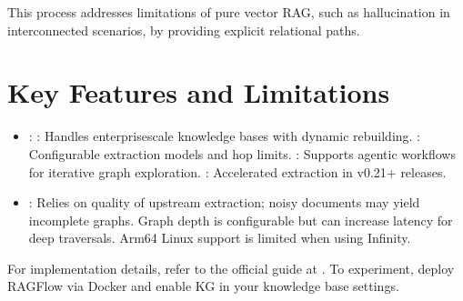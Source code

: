 \documentclass[letterpaper,10pt,english]{sphinxmanual}
\begin{document}
\sphinxAtStartPar
This process addresses limitations of pure vector RAG, such as hallucination in interconnected scenarios, by providing explicit relational paths.


\section{Key Features and Limitations}
\label{\detokenize{graph:key-features-and-limitations}}\begin{itemize}
\item {} 
\sphinxAtStartPar
{}:
\sphinxhyphen{} : Handles enterprise\sphinxhyphen{}scale knowledge bases with dynamic rebuilding.
\sphinxhyphen{} : Configurable extraction models and hop limits.
\sphinxhyphen{} : Supports agentic workflows for iterative graph exploration.
\sphinxhyphen{} : Accelerated extraction in v0.21+ releases.

\item {} 
\sphinxAtStartPar
{}:
\sphinxhyphen{} Relies on quality of upstream extraction; noisy documents may yield incomplete graphs.
\sphinxhyphen{} Graph depth is configurable but can increase latency for deep traversals.
\sphinxhyphen{} Arm64 Linux support is limited when using Infinity.

\end{itemize}

\sphinxAtStartPar
For implementation details, refer to the official guide at . To experiment, deploy RAGFlow via Docker and enable KG in your knowledge base settings.

\sphinxstepscope
\end{document}
